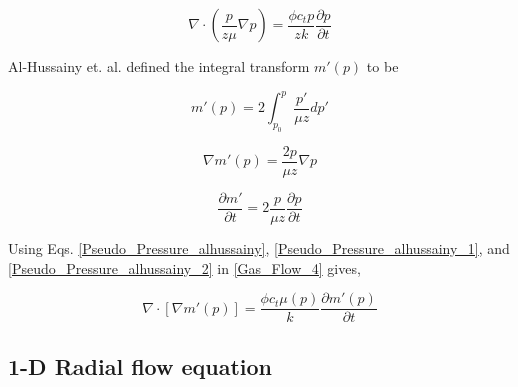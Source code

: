 \documentclass{llncs}
\numberwithin{equation}{section}
\numberwithin{figure}{section}
\numberwithin{table}{section}
\begin{document}
    \begin{equation}
        \nabla \cdot \left( \frac{p}{z\mu }\nabla p \right)=\frac{\phi {{c}_{t}}p}{zk}\frac{\partial p}{\partial t}
        \label{Gas_Flow_4}
    \end{equation}       
    
    Al-Hussainy et. al. \cite{Al-Hussainy_1966_1} defined the integral transform $m'(p)$ to be 
    
    \begin{equation}
        m'\left( p \right)=2\int_{{{p}_{0}}}^{p}{\frac{p'}{\mu z}dp'}
        \label{Pseudo_Pressure_alhussainy}
    \end{equation} 
    
    \begin{equation}
        \nabla m'\left( p \right)=\frac{2p}{\mu z}\nabla p
        \label{Pseudo_Pressure_alhussainy_1}
    \end{equation}    
    
    \begin{equation}
        \frac{\partial m'}{\partial t}=2\frac{p}{\mu z}\frac{\partial p}{\partial t}
        \label{Pseudo_Pressure_alhussainy_2}
    \end{equation}  
         
    Using Eqs. \ref{Pseudo_Pressure_alhussainy}, \ref{Pseudo_Pressure_alhussainy_1}, and \ref{Pseudo_Pressure_alhussainy_2} in \ref{Gas_Flow_4} gives,

    \begin{equation}
        \nabla \cdot \left[ \nabla m'\left( p \right) \right]=\frac{\phi {{c}_{t}}\mu \left( p \right)}{k}\frac{\partial m'\left( p \right)}{\partial t}
        \label{Gas_Flow_Final}
    \end{equation}          
    
    \subsection{1-D Radial flow equation}     
         

    
    

%
\end{document}
